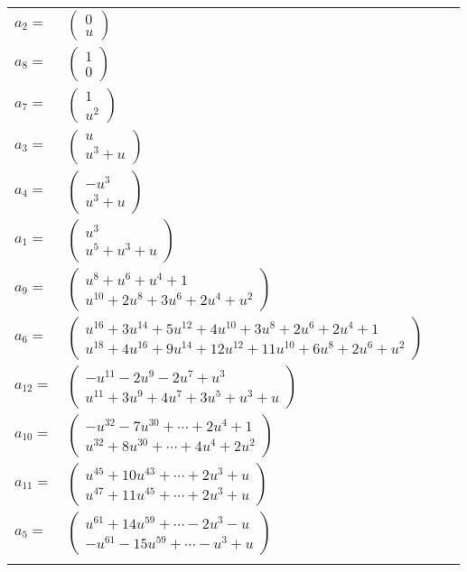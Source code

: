 \documentclass[1p]{elsarticle_modified}
\theoremstyle{definition}
\begin{document}
\begin{tabular}{m{7pt} m{180pt} m{7pt} m{180pt} }
\flushright $a_{2}=$&$\begin{pmatrix}0\\u\end{pmatrix}$ \\
\flushright $a_{8}=$&$\begin{pmatrix}1\\0\end{pmatrix}$ \\
\flushright $a_{7}=$&$\begin{pmatrix}1\\u^2\end{pmatrix}$ \\
\flushright $a_{3}=$&$\begin{pmatrix}u\\u^3+u\end{pmatrix}$ \\
\flushright $a_{4}=$&$\begin{pmatrix}- u^3\\u^3+u\end{pmatrix}$ \\
\flushright $a_{1}=$&$\begin{pmatrix}u^3\\u^5+u^3+u\end{pmatrix}$ \\
\flushright $a_{9}=$&$\begin{pmatrix}u^8+u^6+u^4+1\\u^{10}+2 u^8+3 u^6+2 u^4+u^2\end{pmatrix}$ \\
\flushright $a_{6}=$&$\begin{pmatrix}u^{16}+3 u^{14}+5 u^{12}+4 u^{10}+3 u^8+2 u^6+2 u^4+1\\u^{18}+4 u^{16}+9 u^{14}+12 u^{12}+11 u^{10}+6 u^8+2 u^6+u^2\end{pmatrix}$ \\
\flushright $a_{12}=$&$\begin{pmatrix}- u^{11}-2 u^9-2 u^7+u^3\\u^{11}+3 u^9+4 u^7+3 u^5+u^3+u\end{pmatrix}$ \\
\flushright $a_{10}=$&$\begin{pmatrix}- u^{32}-7 u^{30}+\cdots+2 u^4+1\\u^{32}+8 u^{30}+\cdots+4 u^4+2 u^2\end{pmatrix}$ \\
\flushright $a_{11}=$&$\begin{pmatrix}u^{45}+10 u^{43}+\cdots+2 u^3+u\\u^{47}+11 u^{45}+\cdots+2 u^3+u\end{pmatrix}$ \\
\flushright $a_{5}=$&$\begin{pmatrix}u^{61}+14 u^{59}+\cdots-2 u^3- u\\- u^{61}-15 u^{59}+\cdots- u^3+u\end{pmatrix}$\\&\end{tabular}
\end{document}
